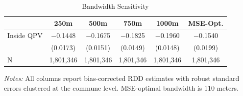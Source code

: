 \begin{table}[htbp]
\centering
\caption{Bandwidth Sensitivity}
\label{tab:robustness}
\begin{threeparttable}
\begin{tabular}{lccccc}
\toprule
 & 250m & 500m & 750m & 1000m & MSE-Opt. \\
\midrule
Inside QPV & $-$0.1448 & $-$0.1675 & $-$0.1825 & $-$0.1960 & $-$0.1540 \\
 & (0.0173) & (0.0151) & (0.0149) & (0.0148) & (0.0199) \\
\midrule
N & 1,801,346 & 1,801,346 & 1,801,346 & 1,801,346 & 1,801,346 \\
\bottomrule
\end{tabular}
\begin{tablenotes}
\small
\item \textit{Notes:} All columns report bias-corrected RDD estimates with robust standard errors clustered at the commune level. MSE-optimal bandwidth is 110 meters.
\end{tablenotes}
\end{threeparttable}
\end{table}
